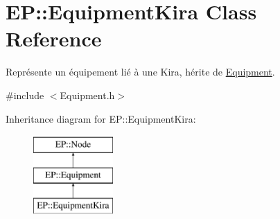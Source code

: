 \hypertarget{class_e_p_1_1_equipment_kira}{}\section{EP\+:\+:Equipment\+Kira Class Reference}
\label{class_e_p_1_1_equipment_kira}


Représente un équipement lié à une Kira, hérite de \hyperlink{class_e_p_1_1_equipment}{Equipment}.  




{\ttfamily \#include $<$Equipment.\+h$>$}

Inheritance diagram for EP\+:\+:Equipment\+Kira\+:\begin{figure}[H]
\begin{center}
\leavevmode
\includegraphics[height=3.000000cm]{class_e_p_1_1_equipment_kira}
\end{center}
\end{figure}
